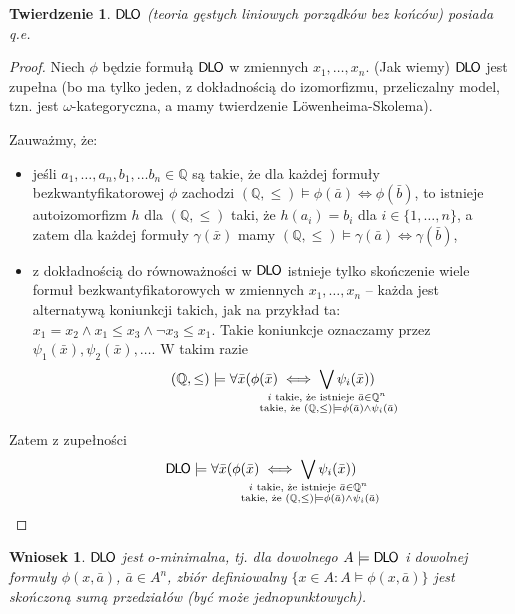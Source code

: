 \documentclass{article}
\newcommand{\Q}{\mathbb{Q}}
\theoremstyle{plain}
\newtheorem{tw}[thm]{Twierdzenie}
\newtheorem{wn}[thm]{Wniosek}
\theoremstyle{definition}
\theoremstyle{remark}
\newcommand{\DLO}{\mathsf{D \mkern-1.5mu L \mkern-1.8mu O}}
\begin{document}
\begin{tw}
	$\DLO$ (teoria gęstych liniowych porządków bez końców) posiada q.e.
\end{tw}
\begin{proof}
	Niech $\phi$ będzie formułą $\DLO$ w zmiennych $x_1, \ldots, x_n$.
	(Jak wiemy) $\DLO$ jest zupełna (bo ma tylko jeden, z dokładnością do
	izomorfizmu, przeliczalny model, tzn. jest $\omega$-kategoryczna, a
	mamy twierdzenie Löwenheima-Skolema).

	Zauważmy, że:
	\begin{itemize}
		\item jeśli $a_1, \ldots, a_n, b_1, \ldots b_n \in \Q$ są
			takie, że dla każdej formuły bezkwantyfikatorowej
			$\phi$ zachodzi $(\Q, \leq) \models \phi(\bar{a}) \iff
			\phi(\bar{b})$, to istnieje autoizomorfizm $h$ dla
			$(\Q, \leq)$ taki, że $h(a_i) = b_i$ dla $i \in \{1,
			\ldots, n\}$, a zatem dla każdej formuły
			$\gamma(\bar{x})$ mamy $(\Q, \leq) \models
			\gamma(\bar{a}) \iff \gamma(\bar{b})$,
		\item z dokładnością do równoważności w $\DLO$ istnieje tylko
			skończenie wiele formuł bezkwantyfikatorowych w
			zmiennych $x_1, \ldots, x_n$ -- każda jest alternatywą
			koniunkcji takich, jak na przykład ta: $x_1 = x_2
			\wedge x_1 \leq x_3 \wedge \neg x_3 \leq x_1$.
			Takie koniunkcje oznaczamy przez $\psi_1(\bar{x}),
			\psi_2(\bar{x}), \ldots$.  W takim razie
			\[(\Q, \leq) \models \forall \bar{x} (\phi(\bar{x})
			\iff \bigvee_{\mathclap{\substack{i \text{ takie, że
			istnieje } \bar{a} \in \Q^n \\ \text{ takie, że }(\Q,
			\leq) \models \phi(\bar{a}) \wedge \psi_i(\bar{a})}}}
			\psi_i(\bar{x}))\]
	\end{itemize}
	Zatem z zupełności
	\[\DLO \models \forall \bar{x} (\phi(\bar{x}) \iff
	\bigvee_{\mathclap{\substack{i \text{ takie, że istnieje } \bar{a} \in
	\Q^n \\ \text{ takie, że }(\Q, \leq) \models \phi(\bar{a}) \wedge
	\psi_i(\bar{a})}}} \psi_i(\bar{x}))\]
\end{proof}

\begin{wn}
	$\DLO$ jest \em{$o$-minimalna}, tj. dla dowolnego $A \models \DLO$ i
	dowolnej formuły $\phi(x,\bar{a})$, $\bar{a} \in A^n$, zbiór
	definiowalny $\{x \in A \colon  A \models \phi(x,\bar{a})\}$ jest
	skończoną sumą przedziałów (być może jednopunktowych).
\end{wn}
\end{document}
